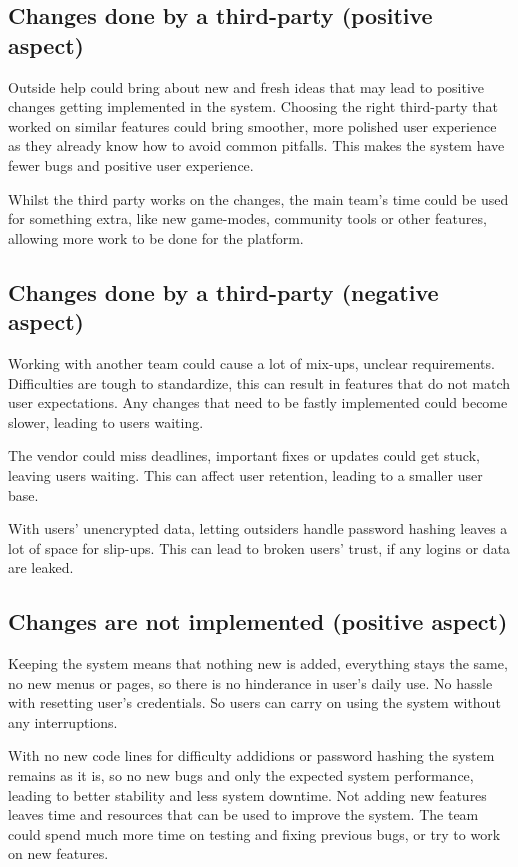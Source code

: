 \documentclass[11pt,a4paper]{article}
\begin{document}
\subsection{Changes done by a third-party (positive aspect)}

Outside help could bring about new and fresh ideas that may lead to positive changes getting implemented in the system. Choosing the right third-party that worked on similar features could bring smoother, more polished user experience as they already know how to avoid common pitfalls. This makes the system have fewer bugs and positive user experience.

Whilst the third party works on the changes, the main team's time could be used for something extra, like new game-modes, community tools or other features, allowing more work to be done for the platform.

\subsection{Changes done by a third-party (negative aspect)}

Working with another team could cause a lot of mix-ups, unclear requirements. Difficulties are tough to standardize, this can result in features that do not match user expectations. Any changes that need to be fastly implemented could become slower, leading to users waiting.

The vendor could miss deadlines, important fixes or updates could get stuck, leaving users waiting. This can affect user retention, leading to a smaller user base.

With users' unencrypted data, letting outsiders handle password hashing leaves a lot of space for slip-ups. This can lead to broken users’ trust, if any logins or data are leaked.


\subsection{Changes are not implemented (positive aspect)}

Keeping the system means that nothing new is added, everything stays the same, no new menus or pages, so there is no hinderance in user's daily use. No hassle with resetting user's credentials. So users can carry on using the system without any interruptions.

With no new code lines for difficulty addidions or password hashing the system remains as it is, so no new bugs and only the expected system performance, leading to better stability and less system downtime. Not adding new features leaves time and resources that can be used to improve the system. The team could spend much more time on testing and fixing previous bugs, or try to work on new features.
\end{document}
